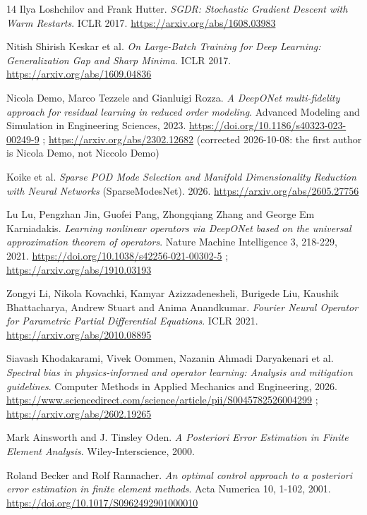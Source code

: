 \documentclass[preprint,12pt]{elsarticle}
\begin{document}
\begin{thebibliography}{14}
Ilya Loshchilov and Frank Hutter. \emph{SGDR: Stochastic Gradient Descent with Warm Restarts}. ICLR 2017. \url{https://arxiv.org/abs/1608.03983}

Nitish Shirish Keskar et al. \emph{On Large-Batch Training for Deep Learning: Generalization Gap and Sharp Minima}. ICLR 2017. \url{https://arxiv.org/abs/1609.04836}

Nicola Demo, Marco Tezzele and Gianluigi Rozza. \emph{A DeepONet multi-fidelity approach for residual learning in reduced order modeling}. Advanced Modeling and Simulation in Engineering Sciences, 2023. \url{https://doi.org/10.1186/s40323-023-00249-9} ; \url{https://arxiv.org/abs/2302.12682} (corrected 2026-10-08: the first author is Nicola Demo, not Niccolo Demo)

Koike et al. \emph{Sparse POD Mode Selection and Manifold Dimensionality Reduction with Neural Networks} (SparseModesNet). 2026. \url{https://arxiv.org/abs/2605.27756}

Lu Lu, Pengzhan Jin, Guofei Pang, Zhongqiang Zhang and George Em Karniadakis. \emph{Learning nonlinear operators via DeepONet based on the universal approximation theorem of operators}. Nature Machine Intelligence 3, 218-229, 2021. \url{https://doi.org/10.1038/s42256-021-00302-5} ; \url{https://arxiv.org/abs/1910.03193}

Zongyi Li, Nikola Kovachki, Kamyar Azizzadenesheli, Burigede Liu, Kaushik Bhattacharya, Andrew Stuart and Anima Anandkumar. \emph{Fourier Neural Operator for Parametric Partial Differential Equations}. ICLR 2021. \url{https://arxiv.org/abs/2010.08895}

Siavash Khodakarami, Vivek Oommen, Nazanin Ahmadi Daryakenari et al. \emph{Spectral bias in physics-informed and operator learning: Analysis and mitigation guidelines}. Computer Methods in Applied Mechanics and Engineering, 2026. \url{https://www.sciencedirect.com/science/article/pii/S0045782526004299} ; \url{https://arxiv.org/abs/2602.19265}

Mark Ainsworth and J. Tinsley Oden. \emph{A Posteriori Error Estimation in Finite Element Analysis}. Wiley-Interscience, 2000.

Roland Becker and Rolf Rannacher. \emph{An optimal control approach to a posteriori error estimation in finite element methods}. Acta Numerica 10, 1-102, 2001. \url{https://doi.org/10.1017/S0962492901000010}

\end{thebibliography}
\end{document}
